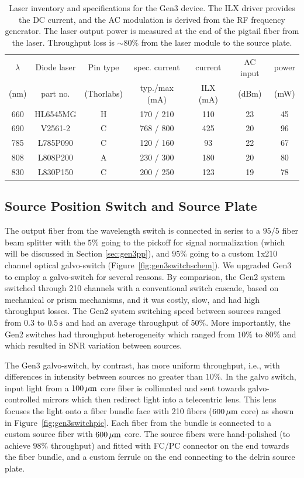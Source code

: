 \begin{table}[h]
\centering
\begin{tabular}{|c|c|c|c|c|c|c|}
\hline
$\lambda$ & Diode laser & Pin type & spec. current & current &AC input & power\\ 
(nm) & part no. & (Thorlabs) & typ./max (mA) & ILX (mA) & (dBm) & (mW) \\ \hline
660 & HL6545MG & H & 170 / 210 & 110 & 23 & 45 \\
690 & V2561-2 & C & 768 / 800 & 425 & 20 & 96 \\
785 & L785P090 & C & 120 / 160 & 93 & 22 & 67 \\
808 & L808P200 & A & 230 / 300 & 180 & 20 & 80 \\
830 & L830P150 & C & 200 / 250 & 123 & 19 & 78 \\ \hline 
\end{tabular}
\caption[Laser inventory and specifications for the Gen3 device]{Laser inventory and specifications for the Gen3 device. The ILX driver provides the DC current, and the AC modulation is derived from the RF frequency generator. The laser output power is measured at the end of the pigtail fiber from the laser. Throughput loss is $\sim 80\%$ from the laser module to the source plate.}
\label{tab:lasertable}
\end{table}
\subsection{Source Position Switch and Source Plate}
\label{sec:sources}
The output fiber from the wavelength switch is connected in series to a $95/5$ fiber beam splitter with the $5\%$ going to the pickoff for signal normalization (which will be discussed in Section \ref{sec:gen3pp}), and $95\%$ going to a custom 1x210 channel optical galvo-switch (Figure~\ref{fig:gen3switchschem}). We upgraded Gen3 to employ a galvo-switch for several reasons. By comparison, the Gen2 system switched through 210 channels with a conventional switch cascade, based on mechanical or prism mechanisms, and it was costly, slow, and had high throughput losses. The Gen2 system switching speed between sources ranged from $0.3$ to $0.5\,{\rm s}$ and had an average throughput of $50\%$. More importantly, the Gen2 switches had throughput heterogeneity which ranged from $10\%$ to $80\%$ and which resulted in SNR variation between sources.

The Gen3 galvo-switch, by contrast, has more uniform throughput, i.e., with differences in intensity between sources no greater than $10\%$. In the galvo switch, input light from a $100\,\mu{\rm m}$ core fiber is collimated and sent towards galvo-controlled mirrors which then redirect light into a telecentric lens. This lens focuses the light onto a fiber bundle face with 210 fibers ($600\,\mu{\rm m}$ core) as shown in Figure~\ref{fig:gen3switchpic}. Each fiber from the bundle is connected to a custom source fiber with $600\,\mu{\rm m}$ core. The source fibers were hand-polished (to achieve $98\%$ throughput) and fitted with FC/PC connector on the end towards the fiber bundle, and a custom ferrule on the end connecting to the delrin source plate.

